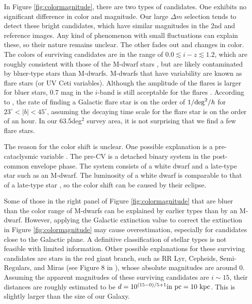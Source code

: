 \documentclass[]{pasj01}
\begin{document}
In Figure \ref{fig:colormagnitude}, there are two types of candidates.
One exhibits no significant difference in color  and  magnitude.
Our large $\Delta m$ selection tends to detect these bright candidates, which have
similar magnitudes in the 2nd and reference images.
Any kind of phenomenon with small fluctuations can explain these, so their nature remains unclear.
The other fades out and changes in color.
The colors of surviving candidates are in the range of $0.0\lesssim i-z \lesssim 1.2$,
which are roughly consistent with those of the M-dwarf stars \citep{2007AJ....134.2398C},
but are likely contaminated by bluer-type stars than M-dwarfs.
M-dwarfs that have variability are known as flare stars (or UV Ceti variables).
Although the amplitude of the flares is larger for bluer  stars,
0.7 mag in the $i$-band is still acceptable for the flares \citep{2009AJ....138..633K}. 
According to \cite{2009AJ....138..633K}, 
the rate of finding a Galactic flare star is on the order of $1/{\rm deg}^2/h$ for $23^{\circ} < |b| < 45^{\circ}$,
assuming the decaying time scale for the flare star is on the order of an hour.
In our 63.5deg$^2$ survey area, it is not surprising that we find a few flare stars.

The reason for the color shift is unclear.
One possible explanation is a pre-cataclysmic variable \citep[pre-CV;][]{2007A&A...474..205T}.
The pre-CV is a detached binary system in the post-common envelope phase.
The system consists of a white dwarf and a late-type star such as an M-dwarf.
The luminosity of a white dwarf is comparable to that of a late-type star  \citep[e.g.][]{1984ApJ...282..612S,2001ApJ...563..971O},
so the color shift can be caused by their eclipse.

Some of those in the right panel of  Figure \ref{fig:colormagnitude} that are bluer than the color range of M-dwarfs can be explained by earlier types  than by an M-dwarf.
However, applying the Galactic extinction value to correct the extinction in Figure \ref{fig:colormagnitude} may cause overestimation, especially for candidates close to the Galactic plane.
A definitive classification of stellar types is not feasible with limited information.
Other possible explanations for these surviving candidates are stars in the red giant branch,
such as RR Lyr, Cepheids, Semi-Regulars, and Miras (see Figure 8 in \citet{2008JPhCS.118a2010E}),
whose absolute magnitudes are around 0.
Assuming the apparent magnitudes of these surviving candidates are $i\sim 15$,
their distances are roughly estimated to be $d = 10^{(15-0)/5+1} {\rm in~pc} = 10{\rm ~kpc}$.
This is slightly larger than the size of our Galaxy.
\end{document}
